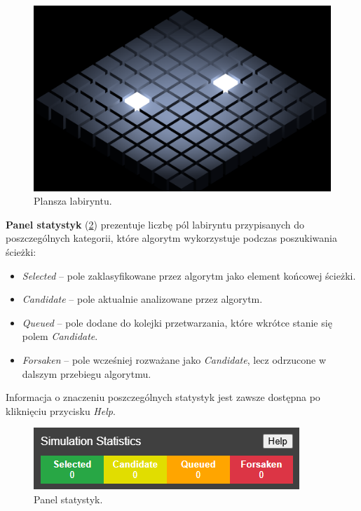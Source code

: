 \documentclass[../doc.tex]{subfiles}
\begin{document}
    \begin{figure}[H]
        \centering
        \includegraphics[width=0.85\linewidth]{figures/field.png}
        \caption{Plansza labiryntu.}
        \label{fig:field}
    \end{figure}

    \textbf{Panel statystyk} (\cref{fig:stats}) prezentuje liczbę pól labiryntu przypisanych do poszczególnych kategorii, które algorytm wykorzystuje podczas poszukiwania ścieżki:

    \begin{itemize}

        \item \textit{Selected} – pole zaklasyfikowane przez algorytm jako element końcowej ścieżki.
        
        \item \textit{Candidate} – pole aktualnie analizowane przez algorytm.
        
        \item \textit{Queued} – pole dodane do kolejki przetwarzania, które wkrótce stanie się polem \textit{Candidate}.
        
        \item \textit{Forsaken} – pole wcześniej rozważane jako \textit{Candidate}, lecz odrzucone w dalszym przebiegu algorytmu.

    \end{itemize}

    \noindent Informacja o znaczeniu poszczególnych statystyk jest zawsze dostępna po kliknięciu przycisku \textit{Help}.

    \begin{figure}[H]
        \centering
        \includegraphics[width=0.6\linewidth]{figures/stats.png}
        \caption{Panel statystyk.}
        \label{fig:stats}
    \end{figure}
\end{document}

